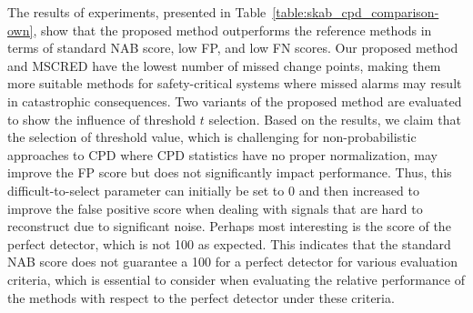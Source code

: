 The results of experiments, presented in Table~\ref{table:skab_cpd_comparison-own}, show that the proposed method outperforms the reference methods in terms of standard NAB score, low FP, and low FN scores. Our proposed method and MSCRED have the lowest number of missed change points, making them more suitable methods for safety-critical systems where missed alarms may result in catastrophic consequences. Two variants of the proposed method are evaluated to show the influence of threshold \(t\) selection. Based on the results, we claim that the selection of threshold value, which is challenging for non-probabilistic approaches to CPD where CPD statistics have no proper normalization, may improve the FP score but does not significantly impact performance. Thus, this difficult-to-select parameter can initially be set to 0 and then increased to improve the false positive score when dealing with signals that are hard to reconstruct due to significant noise. Perhaps most interesting is the score of the perfect detector, which is not 100 as expected. This indicates that the standard NAB score does not guarantee a 100 for a perfect detector for various evaluation criteria, which is essential to consider when evaluating the relative performance of the methods with respect to the perfect detector under these criteria.

